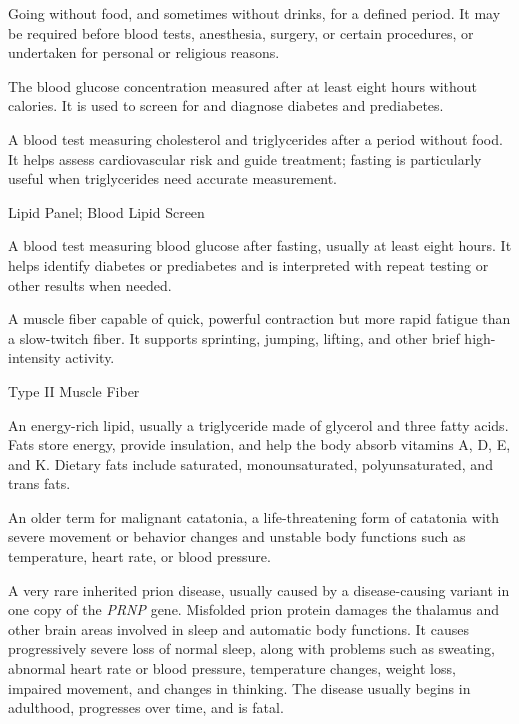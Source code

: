  Going without food, and sometimes without drinks, for a defined period. It may be required before blood tests, anesthesia, surgery, or certain procedures, or undertaken for personal or religious reasons.

 The blood glucose concentration measured after at least eight hours without calories. It is used to screen for and diagnose diabetes and prediabetes.

 A blood test measuring cholesterol and triglycerides after a period without food. It helps assess cardiovascular risk and guide treatment; fasting is particularly useful when triglycerides need accurate measurement.

\synonyms
Lipid Panel; Blood Lipid Screen

 A blood test measuring blood glucose after fasting, usually at least eight hours. It helps identify diabetes or prediabetes and is interpreted with repeat testing or other results when needed.

 A muscle fiber capable of quick, powerful contraction but more rapid fatigue than a slow-twitch fiber. It supports sprinting, jumping, lifting, and other brief high-intensity activity.

\synonyms
Type II Muscle Fiber

 An energy-rich lipid, usually a triglyceride made of glycerol and three fatty acids. Fats store energy, provide insulation, and help the body absorb vitamins A, D, E, and K. Dietary fats include saturated, monounsaturated, polyunsaturated, and trans fats.

 An older term for malignant catatonia, a life-threatening form of catatonia with severe movement or behavior changes and unstable body functions such as temperature, heart rate, or blood pressure.

 A very rare inherited prion disease, usually caused by a disease-causing variant in one copy of the \textit{PRNP} gene. Misfolded prion protein damages the thalamus and other brain areas involved in sleep and automatic body functions. It causes progressively severe loss of normal sleep, along with problems such as sweating, abnormal heart rate or blood pressure, temperature changes, weight loss, impaired movement, and changes in thinking. The disease usually begins in adulthood, progresses over time, and is fatal.

